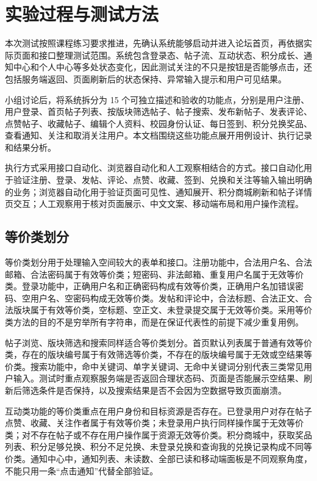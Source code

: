 \documentclass[bwprint]{report}
\begin{document}
\section{实验过程与测试方法}
本次测试按照课程练习要求推进，先确认系统能够启动并进入论坛首页，再依据实际页面和接口整理测试范围。系统包含登录态、帖子流、互动状态、积分成长、通知中心和个人中心等多处状态变化，因此测试关注的不只是按钮是否能够点击，还包括服务端返回、页面刷新后的状态保持、异常输入提示和用户可见结果。

小组讨论后，将系统拆分为 15 个可独立描述和验收的功能点，分别是用户注册、用户登录、首页帖子列表、按版块筛选帖子、帖子搜索、发布新帖子、发表评论、点赞帖子、收藏帖子、编辑个人资料、校园身份认证、每日签到、积分兑换奖品、查看通知、关注和取消关注用户。本文档围绕这些功能点展开用例设计、执行记录和结果分析。

执行方式采用接口自动化、浏览器自动化和人工观察相结合的方式。接口自动化用于验证注册、登录、发帖、评论、点赞、收藏、签到、兑换和关注等输入输出明确的业务；浏览器自动化用于验证页面可见性、通知展开、积分商城刷新和帖子详情页交互；人工观察用于核对页面展示、中文文案、移动端布局和用户操作流程。

\subsection{等价类划分}
等价类划分用于处理输入空间较大的表单和接口。注册功能中，合法用户名、合法邮箱、合法密码属于有效等价类；短密码、非法邮箱、重复用户名属于无效等价类。登录功能中，正确用户名和正确密码构成有效等价类，正确用户名加错误密码、空用户名、空密码构成无效等价类。发帖和评论中，合法标题、合法正文、合法版块属于有效等价类，空标题、空正文、未登录提交属于无效等价类。采用等价类方法的目的不是穷举所有字符串，而是在保证代表性的前提下减少重复用例。

帖子浏览、版块筛选和搜索同样适合等价类划分。首页默认列表属于普通有效等价类，存在的版块编号属于有效筛选等价类，不存在的版块编号属于无效或空结果等价类。搜索功能中，命中关键词、单字关键词、无命中关键词分别代表三类常见用户输入。测试时重点观察服务端是否返回合理状态码、页面是否能展示空结果、刷新后筛选条件是否保持，以及搜索结果是否不会因为空数据导致页面崩溃。

互动类功能的等价类重点在用户身份和目标资源是否存在。已登录用户对存在帖子点赞、收藏、关注作者属于有效等价类；未登录用户执行同样操作属于无效等价类；对不存在帖子或不存在用户操作属于资源无效等价类。积分商城中，获取奖品列表、积分足够兑换、积分不足兑换、未登录兑换和查询我的兑换记录构成不同等价类。通知中心中，通知列表、未读数、全部已读和移动端面板是不同观察角度，不能只用一条“点击通知”代替全部验证。
\end{document}
